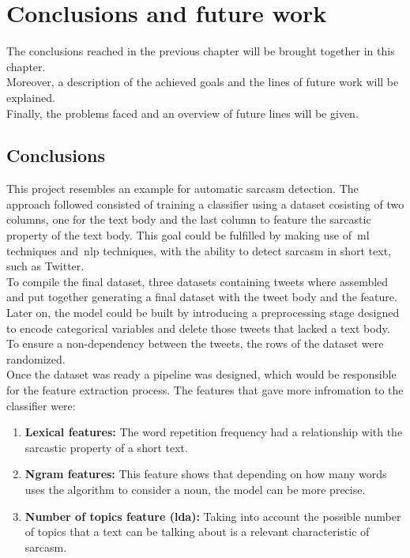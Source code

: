 \chapter{Conclusions and future work}
\label{chap:conclusions}
The conclusions reached in the previous chapter will be brought together in this chapter.\\
Moreover, a description of the achieved goals and the lines of future work will be explained.\\
Finally,  the problems faced and an overview of future lines will be given.

\section{Conclusions}
\label{sec:conclusions}
This project resembles an example for automatic sarcasm detection. The approach followed consisted of training a classifier using a dataset cosisting of two columns, one for the text body and the last column to feature the sarcastic property of the text body. This goal could be fulfilled by making use of~\ac{ml} techniques and~\ac{nlp} techniques, with the ability to detect sarcasm in short text, such as Twitter.\\
To compile the final dataset, three datasets containing tweets where assembled and put together generating a final dataset with the tweet body and the feature.\\
Later on, the model could be built by introducing a preprocessing stage designed to encode categorical variables and delete those tweets that lacked a text body. To ensure a non-dependency between the tweets, the rows of the dataset were randomized.\\
Once the dataset was ready a pipeline was designed, which would be responsible for the feature extraction process. The features that gave more infromation to the classifier were:
\begin{enumerate}
	\item \textbf{Lexical features:} The word repetition frequency had a relationship with the sarcastic property of a short text.
	\item \textbf{Ngram features:} This feature shows that depending on how many words uses the algorithm to consider a noun, the model can be more precise.
	\item \textbf{Number of topics feature (\ac{lda}):} Taking into account the possible number of topics that a text can be talking about is a relevant characteristic of sarcasm.
\end{enumerate} 
